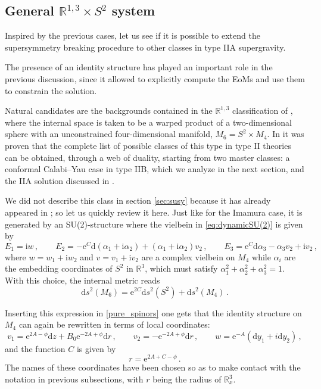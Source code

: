 \documentclass[12pt]{article}
\newcommand{\R}{\mathbb{R}}
\newcommand{\dd}{\mathrm{d}}
\newcommand{\e}{\mathrm{e}}
\newcommand{\ii}{\mathrm{i}}
\begin{document}
\subsection{General $\R^{1,3} \times S^2$ system} \label{sub:iia}

Inspired by the previous cases, let us see if it is possible to extend the supersymmetry breaking procedure to other classes in type IIA supergravity. 


The presence of an identity structure has played an important role in the previous discussion, since it allowed to explicitly compute the EoMs and use them to constrain the solution.

Natural candidates are the backgrounds contained in the $\R^{1,3}$ classification of \cite{macpherson-t,apruzzi-geipel-legramandi-macpherson-zagermann}, where the internal space is taken to be a warped product of a two-dimensional sphere with an unconstrained four-dimensional manifold, $M_6 = S^2 \times M_4$. In \cite{l-macpherson} it was proven that the complete list of possible classes of this type in type II theories can be obtained, through a web of duality, starting from two master classes: a conformal Calabi--Yau case in type IIB, which we analyze in the next section, and the IIA solution discussed in \cite[App.~C]{macpherson-t}.

We did not describe this class in section \ref{sec:susy} because it has already appeared in \cite{macpherson-t,apruzzi-geipel-legramandi-macpherson-zagermann}; so let us quickly review it here. Just like for the Imamura case, it is generated by an SU(2)-structure where the vielbein in \eqref{eq:dynamicSU(2)} is given by
\begin{equation}
E_1 = \ii w \, , \qquad E_2 = - \e^C \dd ( \alpha_1+ \ii \alpha_2)+ (\alpha_1 + \ii \alpha_2) v_2 \, , \qquad  E_3 = \e^C \dd \alpha_3 - \alpha_3 v_2 + \ii v_2 \, ,
\end{equation} 
where $w = w_1 + \ii w_2$ and $v = v_1 + \ii v_2$ are a complex vielbein on $M_4$ while $\alpha_i$ are the embedding coordinates of $S^2$ in $\R^3$, which must satisfy $\alpha_1^2+\alpha_2^2 + \alpha_3^2 = 1$. With this choice, the internal metric reads
\begin{equation}
\dd s^2 (M_6) = \e^{2 C} \dd s^2 (S^2) + \dd s^2 (M_4) \, .
\end{equation}

Inserting this expression in \eqref{pure_spinors} one gets that the identity structure on $M_4$ can again be rewritten in terms of local coordinates:
\begin{equation}
v_1= \e^{2A-\phi} \dd z + B_0 \e^{-2A+\phi} \dd r\,,\qquad v_2=- \e^{-2A+\phi}\dd r\,,\qquad  w= \e^{-A}(\dd y_1+i \dd y_2) \, ,
\end{equation}
and the function $C$ is given by
\begin{equation}
r = \e^{2A+C-\phi} \, .
\end{equation}
The names of these coordinates have been chosen so as to make contact with the notation in previous subsections, with $r$ being the radius of $\R^3_x$.
\end{document}
